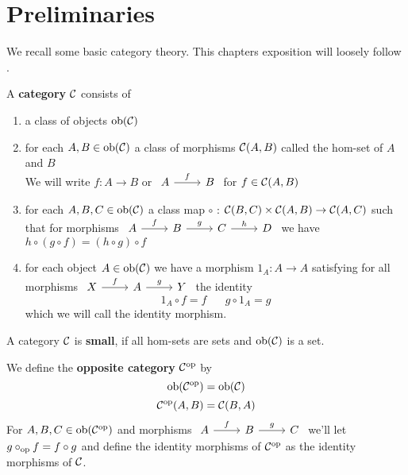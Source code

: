 \chapter{Preliminaries}
    We recall some basic category theory. This chapters exposition will loosely follow \cite{Leinster14}.
\begin{definition}
    A \textbf{category} $\mathcal{C}$ consists of
    \begin{enumerate}
        \item a class of objects $\text{ob}(\mathcal{C})$
        \item for each $A,B\in\text{ob}(\mathcal{C})$ a class of morphisms $\mathcal{C}(A,B)$ called the hom-set of $A$ and $B$\\
        We will write $f : A\to B$ or
$\begin{tikzcd}
A & B
\arrow["f", from=1-1, to=1-2]
\end{tikzcd}$ for $f\in\mathcal{C}(A,B)$
        \item for each $A,B,C\in\text{ob}(\mathcal{C})$ a class map $\circ$ : $\mathcal{C}(B,C)\times\mathcal{C}(A,B)\to \mathcal{C}(A,C)$ such that
    for morphisms $\begin{tikzcd}
        A & B & C & D
        \arrow["f", from=1-1, to=1-2]
        \arrow["g", from=1-2, to=1-3]
        \arrow["h", from=1-3, to=1-4]
    \end{tikzcd}$ we have $h\circ(g\circ f) = (h\circ g)\circ f$
        \item for each object $A\in\text{ob}(\mathcal{C})$ we have a morphism $1_A : A\to A$ satisfying
         for all morphisms $\begin{tikzcd}
            X & A & Y
            \arrow["f", from=1-1, to=1-2]
            \arrow["g", from=1-2, to=1-3]
        \end{tikzcd}$ the identity
        \[1_A \circ f = f \hspace{20pt} g \circ 1_A = g \]
        which we will call the identity morphism. 
    \end{enumerate}
    A category $\mathcal{C}$ is \textbf{small}, if all hom-sets are sets and $\text{ob}(\mathcal{C})$ is a set. \par
    We define the \textbf{opposite category} $\mathcal{C}^{\text{op}}$ by
    \[\text{ob}(\mathcal{C}^{\text{op}}) = \text{ob}(\mathcal{C})\]
    \[\mathcal{C}^{\text{op}}(A,B) = \mathcal{C}(B,A)\]
    For $A,B,C\in\text{ob}(\mathcal{C}^{\text{op}})$ and morphisms $\begin{tikzcd}
	A & B & C
	\arrow["f", from=1-1, to=1-2]
	\arrow["g", from=1-2, to=1-3]
\end{tikzcd}$ we'll let $g\circ_{\text{op}} f = f\circ g$ and define the identity morphisms of $\mathcal{C}^{\text{op}}$ as the identity morphisms of $\mathcal{C}$.
\end{definition}
